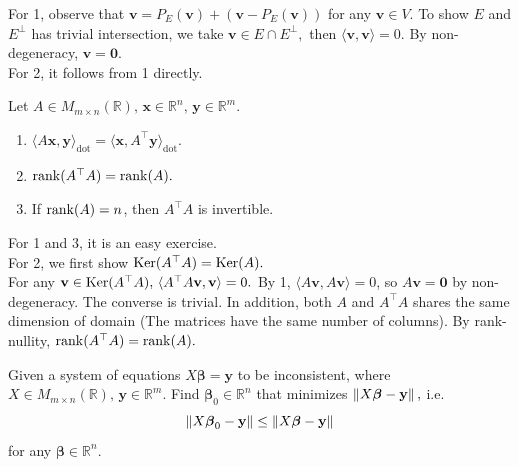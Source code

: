 \documentclass[12pt]{article}
\begin{document}
\begin{pfbox}
    For 1, observe that $\mathbf{v}=P_E(\mathbf{v})+(\mathbf{v}-P_E(\mathbf{v}))$ for any $\mathbf{v}\in V.$ To show $E$ and $E^\perp$ has trivial intersection, we take $\mathbf{v}\in E\cap E^\perp,$ then $\langle \mathbf{v},\mathbf{v}\rangle=0.$ By non-degeneracy, $\mathbf{v}=\mathbf{0}.$\\
    For 2, it follows from 1 directly.
\end{pfbox}

\begin{theorem} 
    Let $A\in M_{m\times n}(\mathbb{R}),\,\mathbf{x}\in\mathbb{R}^n,\,\mathbf{y}\in\mathbb{R}^m.$
    \begin{enumerate}
        \item $\langle A\mathbf{x}, \mathbf{y}\rangle_{\mathrm{dot}} = \langle \mathbf{x}, A^\top \mathbf{y}\rangle_{\mathrm{dot}}.$
        \item $\operatorname{rank}(A^\top A)=\operatorname{rank}(A).$
        \item If $\operatorname{rank}(A)=n$, then $A^\top A$ is invertible.
    \end{enumerate}
\end{theorem}

\begin{pfbox}
    For 1 and 3, it is an easy exercise.\\
    For 2, we first show $\operatorname{Ker}(A^\top A)=\operatorname{Ker}(A).$\\
    For any $\mathbf{v}\in\operatorname{Ker}(A^\top A),\,\langle A^\top A\mathbf{v}, \mathbf{v}\rangle=0.$ By 1, $\langle A\mathbf{v}, A\mathbf{v}\rangle=0$, so $A\mathbf{v}=\mathbf{0}$ by non-degeneracy. The converse is trivial.
    In addition, both $A$ and $A^\top A$ shares the same dimension of domain (The matrices have the same number of columns). By rank-nullity, $\operatorname{rank}(A^\top A)=\operatorname{rank}(A).$
\end{pfbox}



\begin{gbox}
\begin{question}
    Given a system of equations $X\boldsymbol{\beta}=\mathbf{y}$ to be inconsistent, where $X\in M_{m\times n}(\mathbb{R}),\, \mathbf{y}\in \mathbb{R}^m$. Find $\boldsymbol{\beta}_0\in\mathbb{R}^n$ that minimizes $\left\lVert X\boldsymbol{\beta}-\mathbf{y} \right\rVert,$ i.e.
    $$\left\lVert X\boldsymbol{\beta}_0-\mathbf{y} \right\rVert\le\left\lVert X\boldsymbol{\beta}-\mathbf{y} \right\rVert$$ 
    for any $\boldsymbol{\beta}\in\mathbb{R}^n.$
\end{question}
\end{gbox}
\end{document}
